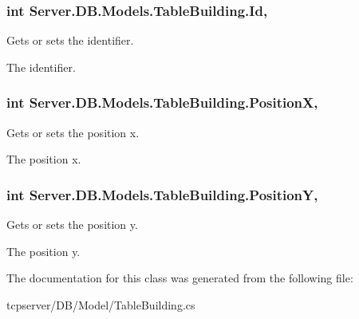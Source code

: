 \subsubsection[{Id}]{\setlength{\rightskip}{0pt plus 5cm}int Server.\+D\+B.\+Models.\+Table\+Building.\+Id\hspace{0.3cm}{\ttfamily [get]}, {\ttfamily [set]}}\label{classServer_1_1DB_1_1Models_1_1TableBuilding_a9d598f41ae682a64c7c9cd05e5fcfd97}


Gets or sets the identifier. 

The identifier.\hypertarget{classServer_1_1DB_1_1Models_1_1TableBuilding_a51f82ae3d59ec5972f1203df61f835b7}{}
\subsubsection[{Position\+X}]{\setlength{\rightskip}{0pt plus 5cm}int Server.\+D\+B.\+Models.\+Table\+Building.\+Position\+X\hspace{0.3cm}{\ttfamily [get]}, {\ttfamily [set]}}\label{classServer_1_1DB_1_1Models_1_1TableBuilding_a51f82ae3d59ec5972f1203df61f835b7}


Gets or sets the position x. 

The position x.\hypertarget{classServer_1_1DB_1_1Models_1_1TableBuilding_ac12da5d0fc35d3fd054286c48e8e34d6}{}
\subsubsection[{Position\+Y}]{\setlength{\rightskip}{0pt plus 5cm}int Server.\+D\+B.\+Models.\+Table\+Building.\+Position\+Y\hspace{0.3cm}{\ttfamily [get]}, {\ttfamily [set]}}\label{classServer_1_1DB_1_1Models_1_1TableBuilding_ac12da5d0fc35d3fd054286c48e8e34d6}


Gets or sets the position y. 

The position y.

The documentation for this class was generated from the following file\+:\begin{DoxyCompactItemize}
\item 
tcpserver/\+D\+B/\+Model/Table\+Building.\+cs\end{DoxyCompactItemize}

